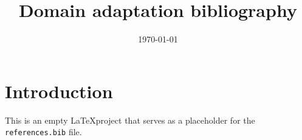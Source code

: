 \documentclass{article}
\title{Domain adaptation bibliography}
\date{\today}
\begin{document}
\maketitle

\section{Introduction}
This is an empty \LaTeX project that serves as a placeholder for the \verb|references.bib| file.
\end{document}

